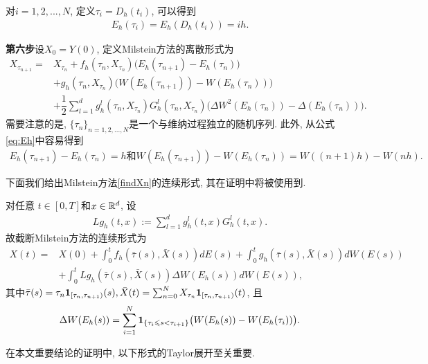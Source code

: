对$i = 1,2,...,N$, 定义$\tau _i = D_h(t_i)$, 可以得到
\begin{align}\label{eq:Eh}
    E_h(\tau _i) = E_h(D_h(t_i)) = ih.
\end{align}
\par 
{\bf 第六步}设$X_0=Y(0)$, 定义Milstein方法的离散形式为
\begin{align}\label{findXn}
     X_{\tau_{n+1}}=&X_{\tau_{n}}+f_{h}(\tau_n,X_{\tau_{n}})\bigg(E_h(\tau_{n+1}) - E_h(\tau_n)\bigg)\nonumber \\
    &+g_{h}(\tau_n,X_{\tau_{n}})\bigg(W(E_h(\tau_{n+1})) - W(E_h(\tau_n)) \bigg)\nonumber \\
    &+\dfrac{1}{2}\sum_{l=1}^{d}g^{l}_{h}(\tau_n,X_{\tau_{n}})G^{l}_{h}(\tau_n,X_{\tau_{n}})\bigg(\Delta W^{2}(E_h(\tau_{n})) -\Delta(E_h(\tau_n)) \bigg).
\end{align}
需要注意的是, $\{\tau_n\}_{n=1,2,...,N}$是一个与维纳过程独立的随机序列. 此外, 从公式\eqref{eq:Eh}中容易得到
\begin{align*}
    E_h(\tau_{n+1}) - E_h(\tau_n) = h \text{和} W(E_h(\tau_{n+1})) - W(E_h(\tau_n)) = W((n+1)h) -W(nh).
\end{align*}

下面我们给出Milstein方法\eqref{findXn}的连续形式, 其在证明中将被使用到.
\par
对任意 $t\in[0,T]$和$x \in \mathbb{R}^d$, 设
\begin{align*}
    Lg_h(t,x):=\sum_{l=1}^{d}g_h^{l}(t,x)G_h^{l}(t,x).
\end{align*}
故截断Milstein方法的连续形式为
\begin{align}
    \label{equ04}
    X(t)=&X(0)+\int_{0}^{t}f_{h}{(\bar{\tau}(s),\bar{X}(s))dE(s)}+\int_{0}^{t}g_{h}{(\bar{\tau}(s),\bar{X}(s))dW(E(s))}\nonumber\\
    &+\int_{0}^{t}Lg_{h}{(\bar{\tau}(s),\bar{X}(s))\Delta W(E_h(s))dW(E(s))},
\end{align}
其中$\bar{\tau}(s)=\tau_n\mathbf{1}_{[\tau_n,\tau_{n+1})}(s), \bar{X}(t)=\sum_{n=0}^{N}X_{\tau_n}\mathbf{1}_{[\tau_n,\tau_{n+1})}(t)$, 且
\begin{align*}
 \Delta W(E_h(s))=\sum_{i=1}^{N}\mathbf{1}_{\left\{\tau_i\leqslant s < \tau_{i+1}\right\} }\big(W(E_h(s))-W(E_h(\tau_i))\big).
\end{align*}

在本文重要结论的证明中, 以下形式的Taylor展开至关重要.

